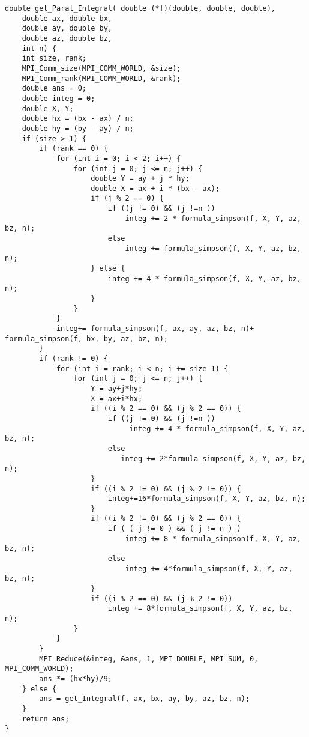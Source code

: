 \documentclass{report}
\begin{document}
\begin{lstlisting}
double get_Paral_Integral( double (*f)(double, double, double),
    double ax, double bx,
    double ay, double by,
    double az, double bz,
    int n) {
    int size, rank;
    MPI_Comm_size(MPI_COMM_WORLD, &size);
    MPI_Comm_rank(MPI_COMM_WORLD, &rank);
    double ans = 0;
    double integ = 0;
    double X, Y;
    double hx = (bx - ax) / n;
    double hy = (by - ay) / n;
    if (size > 1) {
        if (rank == 0) {
            for (int i = 0; i < 2; i++) {
                for (int j = 0; j <= n; j++) {
                    double Y = ay + j * hy;
                    double X = ax + i * (bx - ax);
                    if (j % 2 == 0) {
                        if ((j != 0) && (j !=n ))
                            integ += 2 * formula_simpson(f, X, Y, az, bz, n);
                        else
                            integ += formula_simpson(f, X, Y, az, bz, n);
                    } else {
                        integ += 4 * formula_simpson(f, X, Y, az, bz, n);
                    }
                }
            }
            integ+= formula_simpson(f, ax, ay, az, bz, n)+ formula_simpson(f, bx, by, az, bz, n);
        }
        if (rank != 0) {
            for (int i = rank; i < n; i += size-1) {
                for (int j = 0; j <= n; j++) {
                    Y = ay+j*hy;
                    X = ax+i*hx;
                    if ((i % 2 == 0) && (j % 2 == 0)) {
                        if ((j != 0) && (j !=n ))
                             integ += 4 * formula_simpson(f, X, Y, az, bz, n);
                        else
                           integ += 2*formula_simpson(f, X, Y, az, bz, n);
                    }
                    if ((i % 2 != 0) && (j % 2 != 0)) {
                        integ+=16*formula_simpson(f, X, Y, az, bz, n);
                    }
                    if ((i % 2 != 0) && (j % 2 == 0)) {
                        if ( ( j != 0 ) && ( j != n ) )
                            integ += 8 * formula_simpson(f, X, Y, az, bz, n);
                        else
                            integ += 4*formula_simpson(f, X, Y, az, bz, n);
                    }
                    if ((i % 2 == 0) && (j % 2 != 0))
                        integ += 8*formula_simpson(f, X, Y, az, bz, n);
                }
            }
        }
        MPI_Reduce(&integ, &ans, 1, MPI_DOUBLE, MPI_SUM, 0, MPI_COMM_WORLD);
        ans *= (hx*hy)/9;
    } else {
        ans = get_Integral(f, ax, bx, ay, by, az, bz, n);
    }
    return ans;
}
\end{lstlisting}
\end{document}
